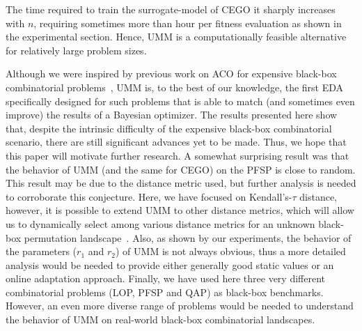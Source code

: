 \documentclass[runningheads]{llncs}
\begin{document}
The time required to train the surrogate-model of 
CEGO  it sharply
increases with $n$, requiring 
sometimes more than hour per fitness evaluation as shown in the experimental section. 
Hence, UMM is a computationally
feasible alternative for relatively large problem sizes.

Although we were inspired by previous work on ACO for expensive black-box
combinatorial problems~\citep{PerLopStu2015si}, UMM is, to the best of our
knowledge, the first EDA specifically designed for such problems that is able
to match (and sometimes even improve) the results of a Bayesian
optimizer.
The results presented here show that, despite the intrinsic difficulty of the
expensive black-box combinatorial scenario, there are still significant
advances yet to be made. Thus, we hope that this paper will motivate further
research. %
A somewhat surprising result was that the behavior of UMM (and the same for
CEGO) on the PFSP is close to random. This result may be due to the distance
metric used, but further analysis is needed to corroborate this
conjecture. Here, we have focused on Kendall's-$\tau$ distance, however, it is
possible to extend UMM to other distance metrics, which will allow us to
dynamically select among various distance metrics for an unknown black-box
permutation landscape~\citep{ZaeStoBar2014:ppsn}. Also, as shown by our
experiments, the behavior of the parameters ($r_1$ and $r_2$) of UMM is not
always obvious, thus a more detailed analysis would be needed to provide either
generally good static values or an online adaptation approach. Finally, we have
used here three very different combinatorial problems (LOP, PFSP and QAP) as
black-box benchmarks. However, an even more diverse range of problems would be
needed to understand the behavior of UMM on real-world black-box combinatorial
landscapes.
\end{document}
